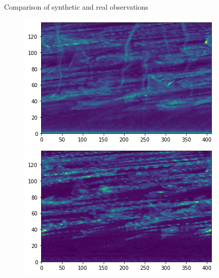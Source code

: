\documentclass[10pt,aspectratio=169,usenames,dvipsnames]{beamer}
\begin{document}
\begin{frame}{Comparison of synthetic and real observations}
\begin{figure}
\includegraphics[width=0.45\linewidth]{2023Dundee/Figures/mg2test.png}
\includegraphics[width=0.45\linewidth]{2023Dundee/Figures/si4test.png}
\end{figure}
\end{frame}
\end{document}
